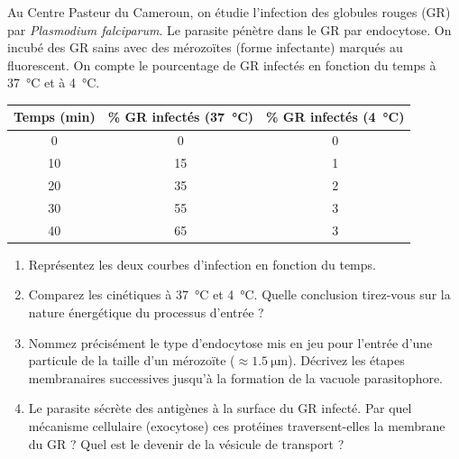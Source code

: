 \documentclass[11pt]{article}
\begin{document}
\begin{exercice}
Au Centre Pasteur du Cameroun, on étudie l'infection des globules rouges (GR) par \textit{Plasmodium falciparum}. Le parasite pénètre dans le GR par endocytose. On incubé des GR sains avec des mérozoïtes (forme infectante) marqués au fluorescent. On compte le pourcentage de GR infectés en fonction du temps à \SI{37}{\celsius} et à \SI{4}{\celsius}.
\begin{center}
\begin{tabular}{|c|c|c|}
\hline
\textbf{Temps (min)} & \textbf{\% GR infectés (\SI{37}{\celsius})} & \textbf{\% GR infectés (\SI{4}{\celsius})} \\
\hline
0 & 0 & 0 \\
10 & 15 & 1 \\
20 & 35 & 2 \\
30 & 55 & 3 \\
40 & 65 & 3 \\
\hline
\end{tabular}
\end{center}
\begin{enumerate}[label=\alph*)]
    \item Représentez les deux courbes d'infection en fonction du temps.
    \item Comparez les cinétiques à \SI{37}{\celsius} et \SI{4}{\celsius}. Quelle conclusion tirez-vous sur la nature énergétique du processus d'entrée ?
    \item Nommez précisément le type d'endocytose mis en jeu pour l'entrée d'une particule de la taille d'un mérozoïte ($ \approx \SI{1,5}{\micro\meter} $). Décrivez les étapes membranaires successives jusqu'à la formation de la vacuole parasitophore.
    \item Le parasite sécrète des antigènes à la surface du GR infecté. Par quel mécanisme cellulaire (exocytose) ces protéines traversent-elles la membrane du GR ? Quel est le devenir de la vésicule de transport ?
\end{enumerate}
\end{exercice}
\end{document}
